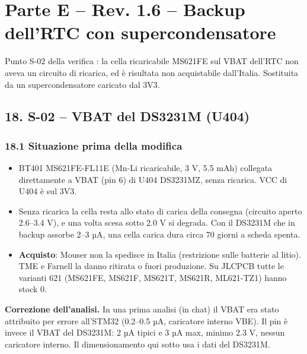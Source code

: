 \clearpage
\section[Parte E – Rev. 1.6 – Backup dell'RTC con supercondensatore]{Parte E – Rev. 1.6 – Backup dell'RTC con supercondensatore}

Punto S-02 della verifica : la cella ricaricabile MS621FE sul VBAT dell'RTC non aveva un circuito di ricarica, ed è risultata non acquistabile dall'Italia. Sostituita da un supercondensatore caricato dal 3V3.

\subsection[18. S-02 – VBAT del DS3231M (U404)]{18. S-02 – VBAT del DS3231M (U404) }

\subsubsection[18.1 Situazione prima della modifica]{18.1 Situazione prima della modifica}

\begin{itemize}
\item BT401 MS621FE-FL11E (Mn-Li ricaricabile, 3 V, 5.5 mAh) collegata direttamente a VBAT (pin 6) di U404 DS3231MZ, senza ricarica. VCC di U404 è sul 3V3.
\item Senza ricarica la cella resta allo stato di carica della consegna (circuito aperto 2.6–3.4 V), e una volta scesa sotto 2.0 V si degrada. Con il DS3231M che in backup assorbe 2–3 µA, una cella carica dura circa 70 giorni a scheda spenta.
\item \textbf{Acquisto}: Mouser non la spedisce in Italia (restrizione sulle batterie al litio). TME e Farnell la danno ritirata o fuori produzione. Su JLCPCB tutte le varianti 621 (MS621FE, MS621F, MS621T, MS621R, ML621-TZ1) hanno stock 0.
\end{itemize}

\begin{notebox}
\textbf{Correzione dell'analisi.} In una prima analisi (in chat) il VBAT era stato attribuito per errore all'STM32 (0.2–0.5 µA, caricatore interno VBE). Il pin è invece il VBAT del DS3231M: 2 µA tipici e 3 µA max, minimo 2.3 V, nessun caricatore interno. Il dimensionamento qui sotto usa i dati del DS3231M.
\end{notebox}

